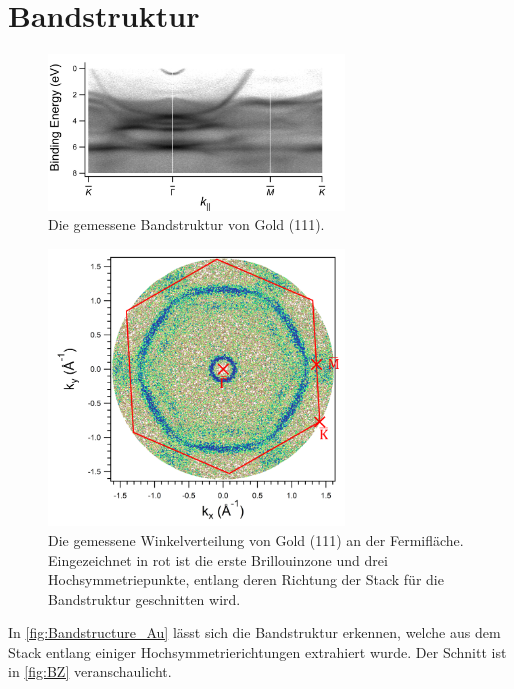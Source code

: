     \section{Bandstruktur}
        \begin{figure}
            \centering
            \includegraphics[width=0.7\textwidth]{./content/pictures/Au/Bandstructure_Au111.png}
            \caption{Die gemessene Bandstruktur von Gold (111).}
            \label{fig:Bandstructure_Au}
        \end{figure}
        \begin{figure}
            \centering
            \includegraphics[width=0.7\textwidth]{./content/pictures/Au/BZ_Au.png}
            \caption{Die gemessene Winkelverteilung von Gold (111) an der Fermifläche.
            Eingezeichnet in rot ist die erste Brillouinzone und drei Hochsymmetriepunkte, entlang deren Richtung der Stack für die Bandstruktur geschnitten wird.}
            \label{fig:BZ}
        \end{figure}
        In \autoref{fig:Bandstructure_Au} lässt sich die Bandstruktur erkennen, welche aus dem Stack entlang einiger Hochsymmetrierichtungen extrahiert wurde.
        Der Schnitt ist in \autoref{fig:BZ} veranschaulicht.


